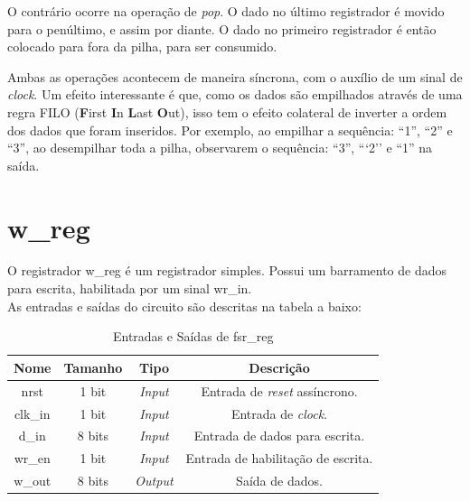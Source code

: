 \documentclass{article}
\begin{document}
O contrário ocorre na operação de \textit{pop}. O dado no último registrador é movido para o penúltimo, e assim por diante. O dado no primeiro registrador é então colocado para fora da pilha, para ser consumido.

Ambas as operações acontecem de maneira síncrona, com o auxílio de um sinal de \textit{clock}. Um efeito interessante é que, como os dados são empilhados através de uma regra FILO (\textbf{F}irst \textbf{I}n \textbf{L}ast \textbf{O}ut), isso tem o efeito colateral de inverter a ordem dos dados que foram inseridos. Por exemplo, ao empilhar a sequência: ``1'', ``2'' e ``3'', ao desempilhar toda a pilha, observarem o sequência: ``3'', ```2'' e ``1'' na saída.

\newpage

\section{w\_reg}

O registrador w\_reg é um registrador simples. Possui um barramento de dados para escrita, habilitada por um sinal wr\_in.\\

As entradas e saídas do circuito são descritas na tabela a baixo:\\

\begin{table}[ht]
    \begin{center}
        \begin{tabular}{|c|c|c|c|}
            \hline
            Nome & Tamanho & Tipo & Descrição\\
            \hline
            nrst & 1 bit & \textit{Input} & Entrada de \textit{reset} assíncrono.\\
            \hline
            clk\_in & 1 bit & \textit{Input} & Entrada de \textit{clock}.\\
            \hline
            d\_in & 8 bits & \textit{Input} & Entrada de dados para escrita.\\
            \hline
            wr\_en & 1 bit & \textit{Input} & Entrada de habilitação de escrita.\\
            \hline
            w\_out & 8 bits & \textit{Output} & Saída de dados.\\
            \hline
        \end{tabular}
    \end{center}
    \caption{Entradas e Saídas de fsr\_reg}
\end{table}
\end{document}
